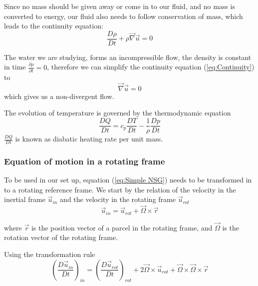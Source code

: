 \documentclass[12pt, a4paper]{article} %
\begin{document}
		
		Since no mass should be given away or come in to our fluid, and no mass is converted to energy, our fluid also needs to follow conservation of mass, which leads to the continuity equation:
		\begin{equation}
			\frac{D\rho}{Dt} + \rho \vec{\nabla} \vec{u} = 0
			\label{eq:Continuity}
		\end{equation}
		
		The water we are studying, forms an incompressible flow, the density is constant in time %
		 $\frac{\partial\rho}{\partial t} =0 $, therefore we can simplify the continuity equation (\ref{eq:Continuity}) to
		\begin{equation}
			\vec{\nabla} \vec{u} = 0
			\label{eq:nondivergence}
		\end{equation}
		which gives us a non-divergent flow.
		
		The evolution of temperature is governed by the thermodynamic equation
		\begin{equation}
			\frac{DQ}{Dt} = c_p \frac{DT}{Dt} - \frac{1}{\rho} \frac{Dp}{Dt}
			\label{eq:Thermodyn}
		\end{equation}
		$\frac{DQ}{Dt}$ is known as diabatic heating rate per unit mass. %
		
		
		\subsubsection{Equation of motion in a rotating frame}		%
			To be used in our set up, equation (\ref{eq:Simple NSG}) needs to be transformed in to a rotating reference frame. We start by the relation of the velocity in the inertial frame $\vec{u}_{in}$ and the velocity in the rotating frame $\vec{u}_{rot}$
			\begin{equation}
				\vec{u}_{in} = \vec{u}_{rot} + \vec{\Omega}\times\vec{r}
				\label{eq:Velocity Frames}
			\end{equation}
			
			where $\vec{r}$ is the position vector of a parcel in the rotating frame, and $\vec{\Omega}$ is the rotation vector of the rotating frame.
			
			Using the transformation rule %
			\begin{equation}
				\left(\frac{D\vec{u}_{in}}{Dt}\right)_{in} = \left(\frac{D\vec{u}_{rot}}{Dt}\right)_{rot} + 2\vec{\Omega}\times\vec{u}_{rot} + \vec{\Omega}\times\vec{\Omega}\times\vec{r}
				\label{eq: Lag Dev Rot}
			\end{equation}
			
\end{document}
